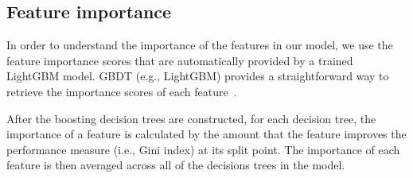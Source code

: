 
\subsection{Feature importance}

In order to understand the importance of the features in our model, we use the feature importance scores that are automatically provided by a trained LightGBM model.
GBDT (e.g., LightGBM) provides a straightforward way to retrieve the importance scores of each feature~\cite{friedman2001elements}.

After the boosting decision trees are constructed, for each decision tree, the importance of a feature is calculated by the amount that the feature improves the performance measure (i.e., Gini index) at its split point.
The importance of each feature is then averaged across all of the decisions trees in the model. 


